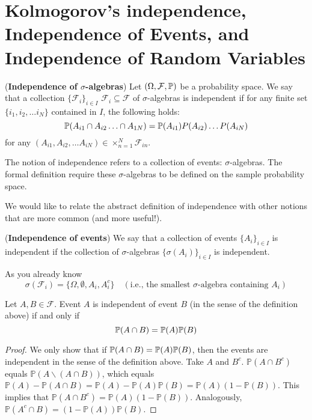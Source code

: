 \documentclass[11pt]{article} %
\begin{document}
\newpage

\appendix

\section{Kolmogorov's independence, Independence of Events, and Independence of Random Variables} 

\begin{definition} (\textbf{Independence of $\sigma$-algebras}) Let $(\Omega, \mathcal{F}, \mathbb{P})$ be a probability space. We say that a collection $\{\mathcal{F}_i\}_{i \in I}$  $\mathcal{F}_i \subseteq \mathcal{F}$ of $\sigma$-algebras is independent if for any finite set $\{i_1, i_2, \ldots i_N\}$ contained in $I$, the following holds:
\begin{equation*}
	\mathbb{P}(A_{i1} \cap A_{i2} \ldots \cap A_{1N})=\mathbb{P}(A_{i1}) P(A_{i2}) \ldots P(A_{iN}) 
\end{equation*}
for any $(A_{i1}, A_{i2}, \ldots A_{iN}) \in \times_{n=1}^{N} \mathcal{F}_{in}.$  
\end{definition}

\noindent The notion of independence refers to a collection of events: $\sigma$-algebras. The formal definition require these $\sigma$-algebras to be defined on the sample probability space.

We would like to relate the abstract definition of independence with other notions that are more common (and more useful!). 

\begin{definition}(\textbf{Independence of events}) We say that a collection of events $\{A_i\}_{i \in I}$ is independent if the collection of $\sigma$-algebras $\{ \sigma(A_i)\}_{i \in I}$ is independent.  
\end{definition}

As you already know
\begin{equation*}
	\sigma(\mathcal{F}_i) = \{ \Omega, \emptyset, A_i, A_i^c\} \quad (\text{i.e., the smallest $\sigma$-algebra containing $A_i$})
\end{equation*}

\begin{proposition}
Let $A,B \in \mathcal{F}$. Event $A$ is independent of event $B$ (in the sense of the definition above) if and only if
$$\mathbb{P}(A \cap B)=\mathbb{P}(A)\mathbb{P}(B) $$
\end{proposition}

\begin{proof}
We only show that if $\mathbb{P}(A \cap B)=\mathbb{P}(A)\mathbb{P}(B)$, then the events are independent in the sense of the definition above. Take $A$ and $B^{c}$. $\mathbb{P}(A \cap B^c)$ equals $\mathbb{P}(A \backslash (A\cap B))$, which equals $\mathbb{P}(A)-\mathbb{P}(A \cap B) = \mathbb{P}(A)-\mathbb{P}(A)\mathbb{P}(B) = \mathbb{P}(A)(1-\mathbb{P}(B))$. This implies that $\mathbb{P}(A \cap B^c) = \mathbb{P}(A)(1-\mathbb{P}(B))$. Analogously, $\mathbb{P}(A^{c} \cap B) = (1-\mathbb{P}(A))\mathbb{P}(B)$.  
\end{proof}
\end{document}
